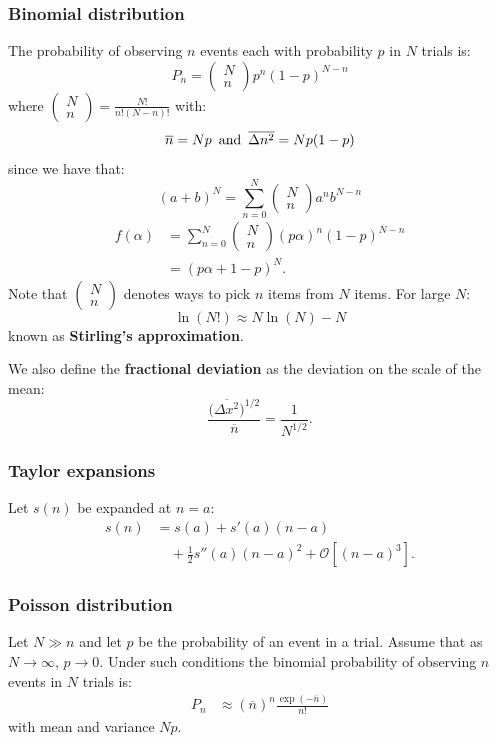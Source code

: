 \documentclass{article}
\begin{document}
\begin{multicols*}{3}
\subsubsection*{Binomial distribution}
The probability of observing $n$ events 
each with probability $p$ in $N$ trials is:
$$P_n=\begin{pmatrix}
N \\ n\end{pmatrix}p^n(1-p)^{N-n}$$
where
$\displaystyle\begin{pmatrix}N \\ n\end{pmatrix}
=\frac{N!}{n!(N-n)!}$ with:
$$\overline{n}=Np
\hspace{0.07in}\text{and}\hspace{0.07in}
\overline{\Delta n^2}=Np(1-p)$$
since we have that:
$$(a+b)^N=\sum_{n=0}^{N}
\begin{pmatrix}N \\ n\end{pmatrix}a^n b^{N-n}$$
\begin{align*}
    f(\alpha)
    &=\sum_{n=0}^{N}\begin{pmatrix}N \\ n\end{pmatrix}
    (p\alpha)^n(1-p)^{N-n} \\
    &=(p\alpha+1-p)^N.
\end{align*}
Note that $\begin{pmatrix}N \\ n\end{pmatrix}$
denotes ways to pick $n$ items 
from $N$ items.
For large $N$:
$$\ln(N!)\approx N\ln(N)-N$$
known as \textbf{Stirling's approximation}.

\newcolumn

We also define the \textbf{fractional deviation}
as the deviation on the scale of the mean:
$$\frac{\bigl(\overline{\Delta x^2}\bigr)^{1/2}}{\overline{n}}
=\frac{1}{N^{1/2}}.$$

\subsubsection*{Taylor expansions}
Let $s(n)$ be expanded at $n=a$:
\begin{align*}
    s(n)&=s(a)+s'(a)(n-a) \\
    &\quad+\frac{1}{2}s''(a)(n-a)^2+\mathcal{O}[(n-a)^3].
\end{align*}

\subsubsection*{Poisson distribution}
Let $N\gg n$ and let $p$ be the probability of 
an event in a trial. Assume that as $N\rightarrow\infty$,
$p\rightarrow0$. Under such conditions
the binomial probability of observing $n$ events 
in $N$ trials is:
\begin{align*}
    P_n
    &\approx(\overline{n})^n\frac{\exp(-\overline{n})}{n!}
\end{align*}
with mean and variance $Np$.


\end{multicols*}
\end{document}
